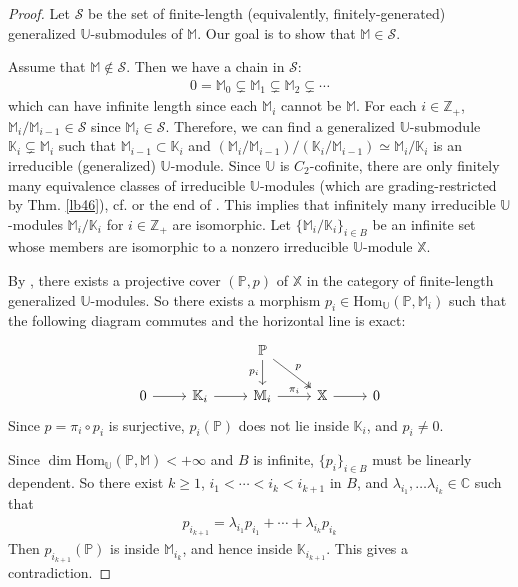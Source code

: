 \documentclass[11pt,b5paper,notitlepage]{article}
\theoremstyle{definition}
\theoremstyle{plain}
\newcommand{\mc}{\mathcal}
\newcommand{\Hom}{\mathrm{Hom}}
\newcommand{\mbb}{\mathbb}
\newcommand{\Ubb}{\mathbb U}
\newcommand{\Xbb}{\mathbb X}
\newcommand{\Mbb}{\mathbb M}
\newcommand{\Cbb}{\mathbb C}
\newcommand{\Zbb}{\mathbb Z}
\newcommand{\Pbb}{\mathbb P}
\newcommand{\<}{\left\langle}
\renewcommand{\>}{\right\rangle}
\numberwithin{equation}{subsection}
\begin{document}
\begin{proof}
Let $\mc S$ be the set of finite-length (equivalently, finitely-generated) generalized $\Ubb$-submodules of $\Mbb$. Our goal is to show that $\Mbb\in\mc S$. 

Assume that $\Mbb\notin\mc S$. Then we have a chain in $\mc S$:
\begin{gather*}
0=\Mbb_0\subsetneq\Mbb_1 \subsetneq\Mbb_2\subsetneq \cdots 
\end{gather*}
which can have infinite length since each $\Mbb_i$ cannot be $\Mbb$. For each $i\in \Zbb_+$, $\Mbb_i/\Mbb_{i-1}\in\mc S$ since  $\Mbb_i\in\mc S$. Therefore, we can find a generalized $\Ubb$-submodule $\mbb K_i\subsetneq \Mbb_i$ such that $\Mbb_{i-1}\subset \mbb K_i$ and $(\Mbb_i/\Mbb_{i-1})/(\mbb K_i/\Mbb_{i-1})\simeq \Mbb_i/\mbb K_i$ is an irreducible (generalized) $\Ubb$-module. Since $\Ubb$ is $C_2$-cofinite, there are only finitely many equivalence classes of irreducible $\Ubb$-modules (which are grading-restricted by Thm. \ref{lb46}), cf. \cite[Prop. 4.2]{Hua-projectivecover} or the end of \cite[Sec. 12]{Gui-sewingconvergence}. This implies that infinitely many irreducible $\Ubb$-modules $\Mbb_i/\mbb K_i$ for $i\in \Zbb_+$ are isomorphic. Let $\{\Mbb_i/\mbb K_i\}_{i\in B}$ be an infinite set whose members are isomorphic to a nonzero irreducible $\Ubb$-module $\Xbb$.
     
By \cite[Thm. 3.23]{Hua-projectivecover}, there exists a projective cover $(\Pbb,p)$ of $\Xbb$ in the category of finite-length generalized $\Ubb$-modules. So there exists a morphism $p_i\in\Hom_\Ubb(\Pbb,\Mbb_i)$ such that the following diagram commutes and the horizontal line is exact:
\begin{equation}
\begin{tikzcd}
            &             & \Pbb \arrow[d,"p_i"'] \arrow[rd, two heads, "p"] &             &   \\
0 \arrow[r] & \mbb K_i \arrow[r] & \Mbb_i \arrow[r,"\pi_i"]            & \Xbb \arrow[r] & 0
\end{tikzcd}
\end{equation}
Since $p=\pi_i\circ p_i$ is surjective, $p_i(\Pbb)$ does not lie inside $\mbb K_i$, and $p_i\neq 0$.

Since $\dim\Hom_\Ubb(\Pbb,\Mbb)<+\infty$ and $B$ is infinite, $\{p_i\}_{i\in B}$ must be linearly dependent. So there exist $k\geq 1$, $i_1<\cdots<i_k<i_{k+1}$ in $B$, and $\lambda_{i_1},\dots\lambda_{i_k}\in\Cbb$ such that 
\begin{align*}
p_{i_{k+1}}=\lambda_{i_1}p_{i_1}+\cdots+\lambda_{i_k}p_{i_k}
\end{align*}
Then $p_{i_{k+1}}(\Pbb)$ is inside $\Mbb_{i_k}$, and hence inside $\mbb K_{i_{k+1}}$. This gives a contradiction.
\end{proof}
\end{document}
